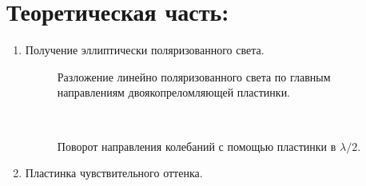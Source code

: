 \section*{Теоретическая часть:}
\begin{enumerate}
    \item Получение эллиптически поляризованного света. \\
    \begin{figure}[h!]
        \noindent{}
        \caption{Разложение линейно поляризованного света по главным направлениям двоякопреломляющей пластинки.}
    \end{figure} \\
    
    
    \begin{figure}[h!]
        \noindent{}
        \caption{Поворот направления колебаний с помощью пластинки в $\lambda / 2$.}
    \end{figure} 
    \newpage
    \item Пластинка чувствительного оттенка. \\
    \begin{figure}[h!]
        \noindent{}
        \caption{}
    \end{figure} \\
    

\end{enumerate}
